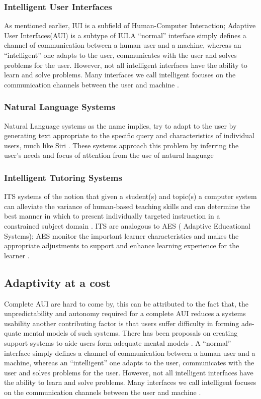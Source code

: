 \subsubsection{Intelligent User Interfaces}
As mentioned earlier, IUI is a subfield of Human-Computer Interaction; Adaptive User Interfaces(AUI) is a subtype of IUI.A ``normal'' interface simply defines a channel of communication between a human user and a machine, whereas an ``intelligent'' one adapts to the user, communicates with the user and solves problems for the user.
However, not all intelligent interfaces have the ability to learn and solve problems. Many interfaces we call intelligent focuses on the communication channels between the user and machine \cite{patrick2003intelligent}.
\subsubsection{Natural Language Systems}
Natural Language systems as the name implies, try to adapt to the user by generating text appropriate to the specific query and characteristics of individual users, much like Siri \cite{website:SIRI}. These systems approach this problem by inferring the user's needs and focus of attention from the use of natural language \cite{benyon1993adaptive}
\subsubsection{Intelligent Tutoring Systems}
ITS systems of the notion that given a student(s) and topic(s) a computer system can alleviate the variance of human-based teaching skills and can determine the best manner in which to present individually targeted instruction in a constrained subject domain \cite{benyon1993adaptive}. ITS are analogous to AES ( Adaptive Educational Systems); AES monitor the important learner characteristics and makes the appropriate adjustments to support and enhance learning experience for the learner \cite{shute2012adaptive}.
\subsection{Adaptivity at a cost}
Complete AUI are hard to come by, this can be attributed to the fact that, the unpredictability and autonomy required for a complete AUI reduces a systems usability 
another contributing factor is that users suffer difficulty in forming ade- quate mental models of such systems. There has been proposals on creating support systems to aide users form adequate mental models \cite{paymans2004usability}. A ``normal'' interface simply defines a channel of communication between a human user and a machine, whereas an ``intelligent'' one adapts to the user, communicates with the user and solves problems for the user.
However, not all intelligent interfaces have the ability to learn and solve problems. Many interfaces we call intelligent focuses on the communication channels between the user and machine \cite{patrick2003intelligent}.
